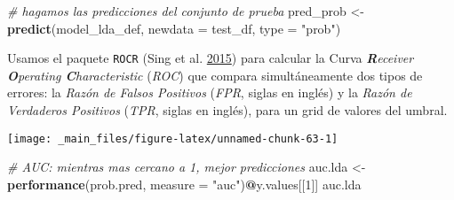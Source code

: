 \documentclass[]{book}
\newenvironment{Shaded}{\begin{snugshade}}{\end{snugshade}}
\newcommand{\CommentTok}[1]{\textcolor[rgb]{0.56,0.35,0.01}{\textit{#1}}}
\newcommand{\DataTypeTok}[1]{\textcolor[rgb]{0.13,0.29,0.53}{#1}}
\newcommand{\DecValTok}[1]{\textcolor[rgb]{0.00,0.00,0.81}{#1}}
\newcommand{\KeywordTok}[1]{\textcolor[rgb]{0.13,0.29,0.53}{\textbf{#1}}}
\newcommand{\NormalTok}[1]{#1}
\newcommand{\OperatorTok}[1]{\textcolor[rgb]{0.81,0.36,0.00}{\textbf{#1}}}
\newcommand{\StringTok}[1]{\textcolor[rgb]{0.31,0.60,0.02}{#1}}
\begin{document}
\begin{Shaded}
\begin{Highlighting}[]
\CommentTok{# hagamos las predicciones del conjunto de prueba}
\NormalTok{pred_prob <-}\StringTok{ }\KeywordTok{predict}\NormalTok{(model_lda_def, }\DataTypeTok{newdata =}\NormalTok{ test_df, }\DataTypeTok{type =} \StringTok{"prob"}\NormalTok{)}
\end{Highlighting}
\end{Shaded}

Usamos el paquete \texttt{ROCR} (Sing et al. \protect\hyperlink{ref-R-ROCR}{2015}) para calcular la Curva \emph{\textbf{R}eceiver \textbf{O}perating \textbf{C}haracteristic} (\emph{ROC}) que compara simultáneamente dos tipos de errores: la \emph{Razón de Falsos Positivos} (\emph{FPR}, siglas en inglés) y la \emph{Razón de Verdaderos Positivos} (\emph{TPR}, siglas en inglés), para un grid de valores del umbral.

\begin{Shaded}
\end{Shaded}

\begin{center}\texttt{[image: \_main\_files/figure-latex/unnamed-chunk-63-1]} \end{center}

\begin{Shaded}
\begin{Highlighting}[]
\CommentTok{# AUC: mientras mas cercano a 1, mejor predicciones}
\NormalTok{auc.lda <-}\StringTok{ }\KeywordTok{performance}\NormalTok{(prob.pred, }\DataTypeTok{measure =} \StringTok{"auc"}\NormalTok{)}\OperatorTok{@}\NormalTok{y.values[[}\DecValTok{1}\NormalTok{]]}
\NormalTok{auc.lda}
\end{Highlighting}
\end{Shaded}
\end{document}
